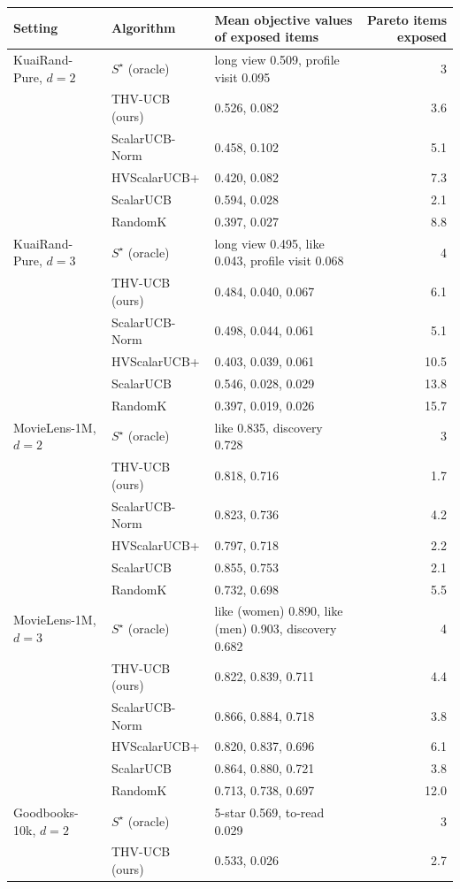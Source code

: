\begin{tabular}{ll l r}
\toprule
Setting & Algorithm & Mean objective values of exposed items & Pareto items exposed\\
\midrule
KuaiRand-Pure, $d=2$ & $S^\star$ (oracle) & long view 0.509, profile visit 0.095 & 3\\
 & THV-UCB (ours) & 0.526, 0.082 & 3.6\\
 & ScalarUCB-Norm & 0.458, 0.102 & 5.1\\
 & HVScalarUCB+ & 0.420, 0.082 & 7.3\\
 & ScalarUCB & 0.594, 0.028 & 2.1\\
 & RandomK & 0.397, 0.027 & 8.8\\
\midrule
KuaiRand-Pure, $d=3$ & $S^\star$ (oracle) & long view 0.495, like 0.043, profile visit 0.068 & 4\\
 & THV-UCB (ours) & 0.484, 0.040, 0.067 & 6.1\\
 & ScalarUCB-Norm & 0.498, 0.044, 0.061 & 5.1\\
 & HVScalarUCB+ & 0.403, 0.039, 0.061 & 10.5\\
 & ScalarUCB & 0.546, 0.028, 0.029 & 13.8\\
 & RandomK & 0.397, 0.019, 0.026 & 15.7\\
\midrule
MovieLens-1M, $d=2$ & $S^\star$ (oracle) & like 0.835, discovery 0.728 & 3\\
 & THV-UCB (ours) & 0.818, 0.716 & 1.7\\
 & ScalarUCB-Norm & 0.823, 0.736 & 4.2\\
 & HVScalarUCB+ & 0.797, 0.718 & 2.2\\
 & ScalarUCB & 0.855, 0.753 & 2.1\\
 & RandomK & 0.732, 0.698 & 5.5\\
\midrule
MovieLens-1M, $d=3$ & $S^\star$ (oracle) & like (women) 0.890, like (men) 0.903, discovery 0.682 & 4\\
 & THV-UCB (ours) & 0.822, 0.839, 0.711 & 4.4\\
 & ScalarUCB-Norm & 0.866, 0.884, 0.718 & 3.8\\
 & HVScalarUCB+ & 0.820, 0.837, 0.696 & 6.1\\
 & ScalarUCB & 0.864, 0.880, 0.721 & 3.8\\
 & RandomK & 0.713, 0.738, 0.697 & 12.0\\
\midrule
Goodbooks-10k, $d=2$ & $S^\star$ (oracle) & 5-star 0.569, to-read 0.029 & 3\\
 & THV-UCB (ours) & 0.533, 0.026 & 2.7\\

\end{tabular}
